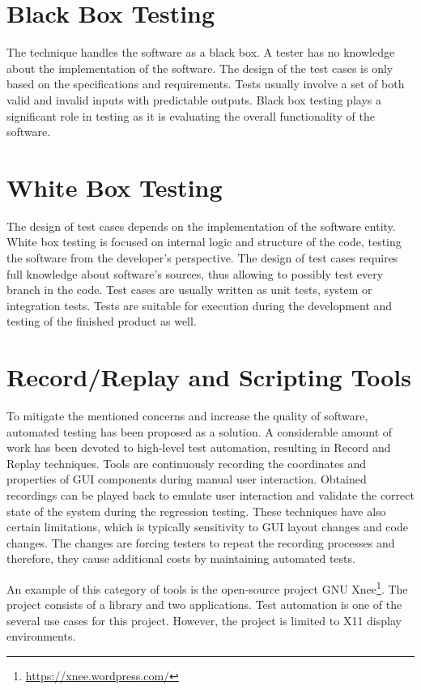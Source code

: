 \section{Black Box Testing}
The technique handles the software as a black box. A tester has no knowledge about the implementation of the software. The design of the test cases is only based on the specifications and requirements. Tests usually involve a set of both valid and invalid inputs with predictable outputs. Black box testing plays a significant role in testing as it is evaluating the overall functionality of the software.\cite{white_black}

\section{White Box Testing}
The design of test cases depends on the implementation of the software entity. White box testing is focused on internal logic and structure of the code, testing the software from the developer's perspective. The design of test cases requires full knowledge about software's sources, thus allowing to possibly test every branch in the code. Test cases are usually written as unit tests, system or integration tests. Tests are suitable for execution during the development and testing of the finished product as well.\cite{white_black}

\section{Record/Replay and Scripting Tools}
To mitigate the mentioned concerns and increase the quality of software, automated testing has been proposed as a solution. A considerable amount of work has been devoted to high-level test automation, resulting in Record and Replay techniques. Tools are continuously recording the coordinates and properties of GUI components during manual user interaction. Obtained recordings can be played back to emulate user interaction and validate the correct state of the system during the regression testing. These techniques have also certain limitations, which is typically sensitivity to GUI layout changes and code changes. The changes are forcing testers to repeat the recording processes and therefore, they cause additional costs by maintaining automated tests.\cite{guitesting} 

An example of this category of tools is the open-source project GNU Xnee\footnote{\url{https://xnee.wordpress.com/}}. The project consists of a library and two applications. Test automation is one of the several use cases for this project. However, the project is limited to X11 display environments.\cite{xnee}

